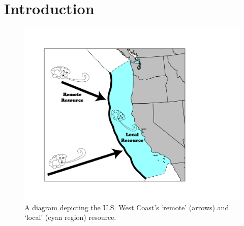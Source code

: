 \section{Introduction}




\begin{figure}[ht]
    \centering
  \includegraphics[width=0.9\linewidth]{../diagram/EEZ_contour03_edit01.png}
    \caption{A diagram depicting the U.S. West Coast’s ‘remote’ (arrows) and ‘local’ (cyan region) resource.}
    \label{fig:diagram:west-eez}
  \end{figure}
